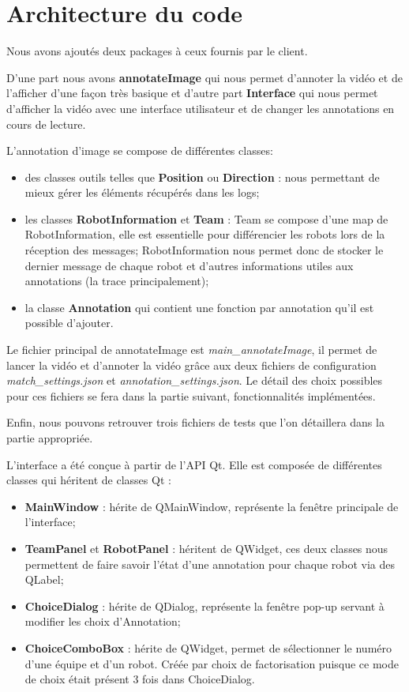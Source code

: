 \section{Architecture du code}

Nous avons ajoutés deux packages à ceux fournis par le client.

D'une part nous avons \textbf{annotateImage} qui nous permet 
d'annoter la vidéo et de l'afficher d'une façon très basique 
et d'autre part \textbf{Interface} qui nous permet d'afficher 
la vidéo avec une interface utilisateur et de changer les 
annotations en cours de lecture.
\bigskip

L'annotation d'image se compose de différentes classes:
\begin{itemize}
    \item des classes outils telles que \textbf{Position} ou 
    \textbf{Direction} : nous permettant de mieux gérer les 
    éléments récupérés dans les logs;
    \item les classes \textbf{RobotInformation} et 
    \textbf{Team} : Team se compose d'une map de
    RobotInformation, elle est essentielle pour différencier 
    les robots lors de la réception des messages; 
    RobotInformation nous permet donc de stocker le dernier 
    message de chaque robot et d'autres informations utiles 
    aux annotations (la trace principalement);
    \item la classe \textbf{Annotation} qui contient une 
    fonction par annotation qu'il est possible d'ajouter.
\end{itemize}
\bigskip

Le fichier principal de annotateImage est 
\textit{main\_annotateImage}, il permet de lancer la vidéo et 
d'annoter la vidéo grâce aux deux fichiers de configuration 
\textit{match\_settings.json} et 
\textit{annotation\_settings.json}. Le détail des choix 
possibles pour ces fichiers se fera dans la partie suivant, 
fonctionnalités implémentées.
\bigskip

Enfin, nous pouvons retrouver trois fichiers de tests que l'on
détaillera dans la partie appropriée.
\bigskip

\newpage

L'interface a été conçue à partir de l'API Qt. Elle est 
composée de différentes classes qui héritent de classes Qt :
\begin{itemize}
    \item \textbf{MainWindow} : hérite de QMainWindow,
    représente la fenêtre principale de l'interface;
    \item \textbf{TeamPanel} et \textbf{RobotPanel} : héritent
    de QWidget, ces deux classes nous permettent de faire
    savoir l'état d'une annotation pour chaque robot via des
    QLabel;
    \item \textbf{ChoiceDialog} : hérite de QDialog,
    représente la fenêtre pop-up servant à modifier les choix
    d'Annotation;
    \item \textbf{ChoiceComboBox} : hérite de QWidget, permet
    de sélectionner le numéro d'une équipe et d'un robot.
    Créée par choix de factorisation puisque ce mode de choix
    était présent 3 fois dans ChoiceDialog.
\end{itemize}
\bigskip

